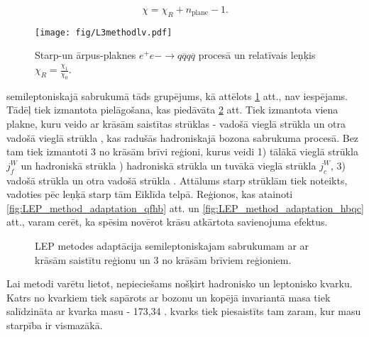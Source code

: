 \begin{equation}
  \chi=\chi_{R} + n_{\text{plane}} - 1.
\end{equation}

\begin{figure}[hbtp]
  \centering
  \texttt{[image: fig/L3methodlv.pdf]}
  \caption{Starp-\PW un ārpus-\PW plaknes $e^{+}e{-}\rightarrow q\overline{q}q\overline{q}$ procesā un relatīvais leņķis $\chi_{R}=\frac{\chi_{1}}{\chi_{0}}$.}
  \label{fig:LEP_method}
\end{figure}

 \ttbar semileptoniskajā sabrukumā tāds grupējums, kā attēlots \ref{fig:LEP_method} att., nav iespējams. Tādēļ tiek izmantota pielāgošana, kas piedāvāta \ref{fig:LEP_method_adaptation} att. Tiek izmantota viena plakne, kuru veido ar krāsām saistītas strūklas - vadošā vieglā strūkla \leadingjet un otra vadošā vieglā strūkla \scndleadingjet, kas radušās hadroniskajā \PW bozona sabrukuma procesā. Bez tam tiek izmantoti 3 no krāsām brīvi reģioni, kurus veidi 1) tālākā vieglā strūkla $j^{W}_{f}$ un hadroniskā \cPqb strūkla ) hadroniskā \cPqb strūkla \hadronicb un tuvākā vieglā strūkla $j^{W}_{c}$, 3) vadošā \cPqb strūkla \leadingb un otra vadošā \cPqb strūkla \scndleadingb. Attālums starp strūklām tiek noteikts, vadoties pēc leņķā starp tām Eiklīda telpā. Reģionos, kas atainoti \ref{fig:LEP_method_adaptation_qfhb} att. un \ref{fig:LEP_method_adaptation_hbqc}  att., varam cerēt, ka spēsim novērot krāsu atkārtota savienojuma efektus.

\begin{figure}[hbtp]
  \centering
  \def\twidth{0.24}
  \hfil
 \hfil
  \hfil
  \caption{LEP metodes adaptācija \ttbar semileptoniskajam sabrukumam ar ar krāsām saistītu reģionu un 3 no krāsām brīviem reģioniem.}
  \label{fig:LEP_method_adaptation}
\end{figure}

Lai metodi varētu lietot, nepieciešams nošķirt hadronisko un leptonisko \cPqb kvarku. Katrs no \cPqb kvarkiem tiek sapārots ar \PW bozonu un kopējā invariantā masa tiek salīdzināta ar \cPqt kvarka masu - 173,34 \GeV. \cPqb kvarks tiek piesaistīts tam zaram, kur masu starpība ir vismazākā. 

